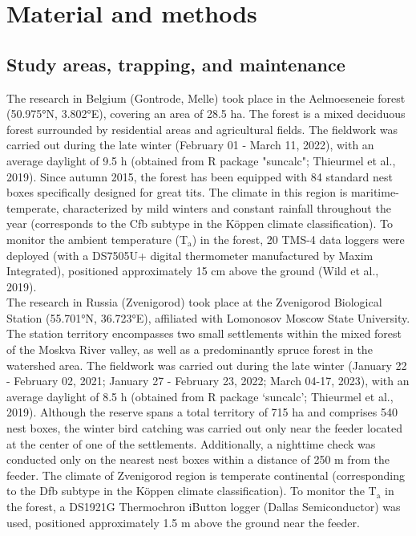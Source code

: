 \documentclass[10pt, twoside]{book} %
\begin{document}
\section{Material and methods}
 
\subsection{Study areas, trapping, and maintenance}
The research in Belgium (Gontrode, Melle) took place in the Aelmoeseneie forest (50.975°N, 3.802°E), covering an area of 28.5 ha. The forest is a mixed deciduous forest surrounded by residential areas and agricultural fields. The fieldwork was carried out during the late winter (February 01 - March 11, 2022), with an average daylight of 9.5 h (obtained from R package "suncalc"; Thieurmel et al., 2019). Since autumn 2015, the forest has been equipped with 84 standard nest boxes specifically designed for great tits. The climate in this region is maritime-temperate, characterized by mild winters and constant rainfall throughout the year (corresponds to the Cfb subtype in the K{\"o}ppen climate classification). To monitor the ambient temperature (T$_{\text{a}}$) in the forest, 20 TMS-4 data loggers were deployed (with a DS7505U+ digital thermometer manufactured by Maxim Integrated), positioned approximately 15 cm above the ground (Wild et al., 2019).\\


The research in Russia (Zvenigorod) took place at the Zvenigorod Biological Station (55.701°N, 36.723°E), affiliated with Lomonosov Moscow State University. The station territory encompasses two small settlements within the mixed forest of the Moskva River valley, as well as a predominantly spruce forest in the watershed area. The fieldwork was carried out during the late winter (January 22 - February 02, 2021; January 27 - February 23, 2022; March 04-17, 2023), with an average daylight of 8.5 h (obtained from R package ‘suncalc’; Thieurmel et al., 2019). Although the reserve spans a total territory of 715 ha and comprises 540 nest boxes, the winter bird catching was carried out only near the feeder located at the center of one of the settlements. Additionally, a nighttime check was conducted only on the nearest nest boxes within a distance of 250 m from the feeder. The climate of Zvenigorod region is temperate continental (corresponding to the Dfb subtype in the K{\"o}ppen climate classification). To monitor the T$_{\text{a}}$ in the forest, a DS1921G Thermochron iButton logger (Dallas Semiconductor) was used, positioned approximately 1.5 m above the ground near the feeder.\\
\end{document}
